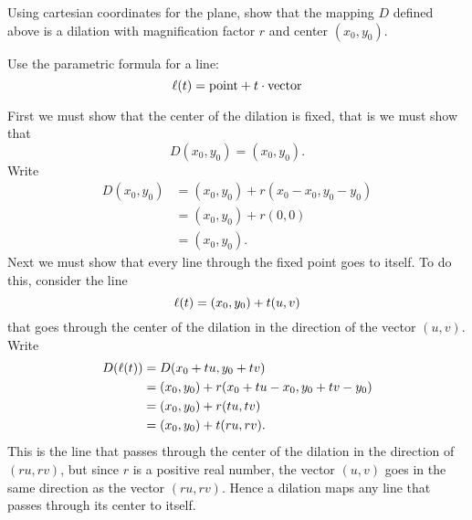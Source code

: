 \documentclass[newpage,hints,handout]{ximera}
\begin{document}
\begin{problem}
Using cartesian coordinates for the plane, show that the mapping $D$
defined above is a dilation with magnification factor $r$ and center
$\left( x_{0},y_{0}\right) $.
\begin{hint}
  Use the parametric formula for a line:
  \[
  \ell(t) = \text{point} + t \cdot \text{vector}
  \]
\end{hint}
\begin{freeResponse}
First we must show that the center of the dilation is fixed, that is we must show that 
\[
D(x_0,y_0) = (x_0,y_0).
\]
Write
\begin{align*}
D(x_0,y_0) &= (x_0,y_0) + r(x_0-x_0,y_0-y_0)\\
&= (x_0,y_0) + r(0,0)\\
&=(x_0,y_0).
\end{align*}
Next we must show that every line through the fixed point goes to
itself. To do this, consider the line
\[
\ell(t) = (x_0,y_0) + t(u,v)
\]
that goes through the center of the dilation in the direction of the
vector $(u,v)$. Write
\begin{align*}
D(\ell(t)) &= D(x_0+tu,y_0+tv)\\
&= (x_0,y_0) + r(x_0+tu-x_0,y_0+tv-y_0)\\
&= (x_0,y_0) + r(tu,tv)\\
&= (x_0,y_0) + t(ru,rv). 
\end{align*}
This is the line that passes through the center of the dilation in the
direction of $(ru,rv)$, but since $r$ is a positive real number, the
vector $(u,v)$ goes in the same direction as the vector
$(ru,rv)$. Hence a dilation maps any line that passes through its
center to itself.


\end{freeResponse}
\end{problem}
\end{document}
